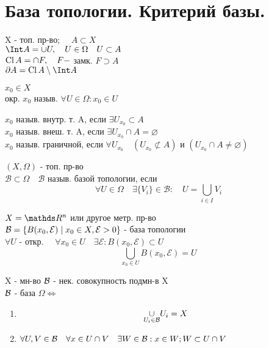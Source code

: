 \documentclass[geometry.tex]{subfiles}
\begin{document}
  \section{База топологии. Критерий базы.}

  \begin{definition}
      X - топ. пр-во; $\quad A \subset X$ \\
      $\Int A = \cup U, \quad U \in \Omega \quad U \subset A$\\
      $\mathop{\rm Cl}\nolimits A = \cap F, \quad F - $ замк. $F \supset A$ \\
      $\partial A = \Cl A \setminus \Int A$
  \end{definition}

  \begin{definition}
      $x_0 \in X$\\
      окр. $x_0$ назыв. $\forall U \in \Omega: x_0 \in U$
  \end{definition}

  \begin{definition}
      $x_0$ назыв. внутр. т. A, если $\exists U_{x_0} \subset A$\\
      $x_0$ назыв. внеш. т. A, если $\exists U_{x_0} \cap A = \varnothing$\\
      $x_0$ назыв. граничной, если $\forall U_{x_0} \quad (U_{x_0} \not \subset A)$ и $(U_{x_0} \cap A \neq \varnothing)$
  \end{definition}

  \begin{definition}
      $(X, \Omega)$ - топ. пр-во\\
      $\mathcal{B} \subset \Omega \quad \mathcal{B}$ назыв. базой топологии, если\\
      \[\forall U \in \Omega \quad \exists \{V_i\} \in \mathcal{B}: \quad U = \bigcup_{i \in I} V_i\]
  \end{definition}

  \begin{example}
      $X = \R^n$ или другое метр. пр-во\\
      $\mathcal{B} = \{B(x_0, \mathcal{E}) \; | \; x_0 \in X, \mathcal{E} > 0\}$ - база топологии\\
      $\forall U$ - откр. $\quad \forall x_0 \in U \quad \exists \mathcal{E}: B(x_0, \mathcal{E}) \subset U$\\
      \[\bigcup_{x_0 \in U} B(x_0, \mathcal{E}) = U\]
  \end{example}

  \begin{theorem}
      X - мн-во $\mathcal{B}$ - нек. совокупность подмн-в X\\
      $\mathcal{B}$ - база $\Omega \Leftrightarrow$ \begin{enumerate}
          \item \[\underset{U_i \in \mathcal{B}}{\cup} U_i = X\]
          \item $\forall U, V \in \mathcal{B} \quad \forall x \in U \cap V \quad \exists W \in \mathcal{B} : x \in W; W \subset U\cap V$
      \end{enumerate}
  \end{theorem}
\end{document}
